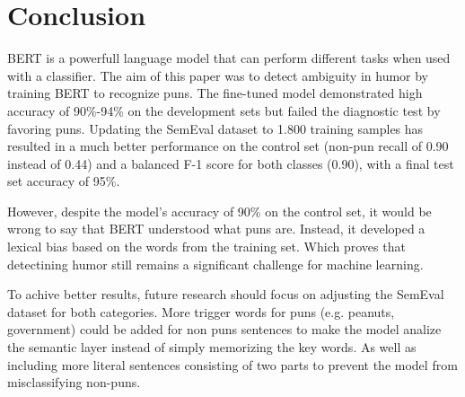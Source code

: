\documentclass[11pt,a4paper]{article}
\begin{document}
 

\section{Conclusion}
BERT is a powerfull language model that can perform different tasks when used with a classifier. The aim of this paper was to detect ambiguity in humor by training BERT to recognize puns. The fine-tuned model demonstrated high accuracy of 90\%-94\% on the development sets but failed the diagnostic test by favoring puns. Updating the SemEval dataset to 1.800 training samples has resulted in a much better performance on the control set (non-pun recall of 0.90 instead of 0.44) and a balanced F-1 score for both classes (0.90), with a final test set accuracy of 95\%.

However, despite the model's accuracy of 90\% on the control set, it would be wrong to say that BERT understood what puns are. Instead, it developed a lexical bias based on the words from the training set. Which proves that detectining humor still remains a significant challenge for machine learning.

To achive better results, future research should focus on adjusting the SemEval dataset for both categories. More trigger words for puns (e.g. peanuts, government) could be added for non puns sentences to make the model analize the semantic layer instead of simply memorizing the key words. As well as including more literal sentences consisting of two parts to prevent the model from misclassifying non-puns.

\nocite{*}


\end{document}

